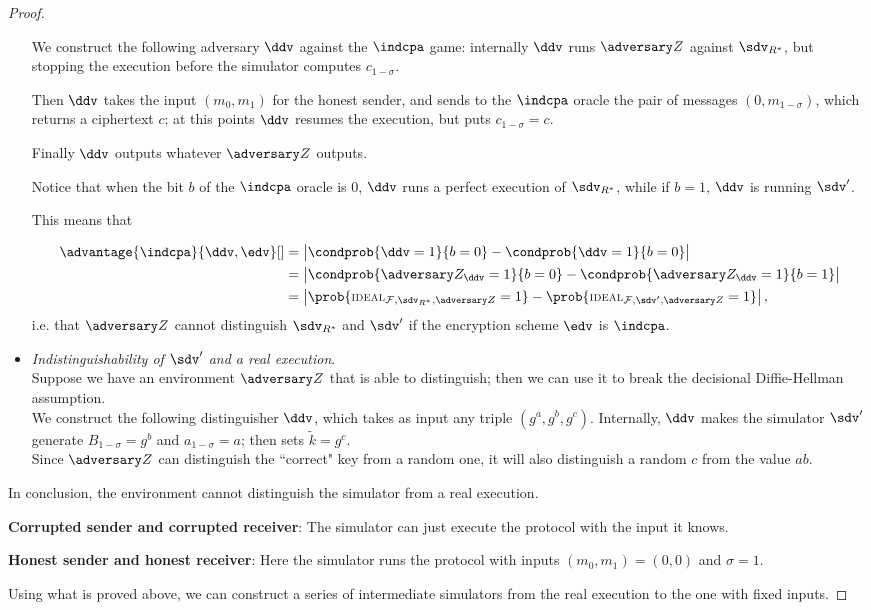 \begin{proof}
\begin{itemize}
        We construct the following adversary $\ddv$ against the $\indcpa$ game: internally $\ddv$ runs $\zdv$ against $\sdv_{R^\ast}$, but stopping the execution before the simulator computes $c_{1-\sigma}$.
        
        Then $\ddv$ takes the input $(m_0,m_1)$ for the honest sender, and sends to the $\indcpa$ oracle the pair of messages $(0,m_{1-\sigma})$, which returns a ciphertext $c$; at this points $\ddv$ resumes the execution, but puts $c_{1-\sigma}=c$.
        
        Finally $\ddv$ outputs whatever $\zdv$ outputs.
        
        Notice that when the bit $b$ of the $\indcpa$ oracle is $0$, $\ddv$ runs a perfect execution of $\sdv_{R^\ast}$, while if $b=1$, $\ddv$ is running $\sdv'$.
        
        This means that
        
        \begin{align*}
        \advantage{\indcpa}{\ddv,\edv}[] &= \left| \condprob{\ddv=1}{b=0} -  \condprob{\ddv=1}{b=0}\right|\\
        & = \left| \condprob{\zdv_\ddv=1}{b=0} - \condprob{\zdv_\ddv=1}{b=1} \right|\\
        & = \left| \prob{\textsc{\scriptsize IDEAL}_{\Fun,\sdv_{R^\ast},\zdv}=1} - \prob{\textsc{\scriptsize IDEAL}_{\Fun,\sdv',\zdv}=1} \right|,
        \end{align*}
        i.e. that $\zdv$ cannot distinguish $\sdv_{R^\ast}$ and $\sdv'$ if the encryption scheme $\edv$ is $\indcpa$.
        
        \item \textit{Indistinguishability of $\sdv'$ and a real execution}.\\
        Suppose we have an environment $\zdv$ that is able to distinguish; then we can use it to break the decisional Diffie-Hellman assumption.\\
        We construct the following distinguisher $\ddv$, which takes as input any triple $(g^a,g^b,g^c)$. Internally, $\ddv$ makes the simulator $\sdv'$ generate $B_{1-\sigma}=g^b$ and $a_{1-\sigma}=a$; then sets $\tilde k=g^c$.\\
        Since $\zdv$ can distinguish the ``correct" key from a random one, it will also distinguish a random $c$ from the value $ab$.
    \end{itemize}

    In conclusion, the environment cannot distinguish the simulator from a real execution.

    \textbf{Corrupted sender and corrupted receiver}: The simulator can just execute the protocol with the input it knows.

    \textbf{Honest sender and honest receiver}: Here the simulator runs the protocol with inputs $(m_0,m_1)=(0,0)$ and $\sigma=1$.

    Using what is proved above, we can construct a series of intermediate simulators from the real execution to the one with fixed inputs.
\end{proof}

